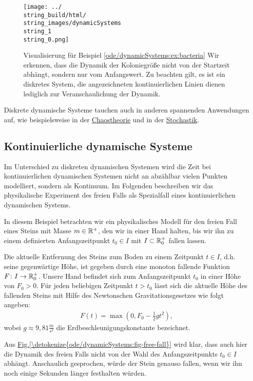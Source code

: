 \begin{figure}[htbp]
\centering


\noindent\texttt{[image: ../\\string\_build/html/\\string\_images/dynamicSystems\\string\_1\\string\_0.png]}
\caption{Visualisierung für Beispiel \cref{ode/dynamicSystems:ex:bacteria}  Wir erkennen, dass die Dynamik der Koloniegröße nicht von der Startzeit abhängt, sondern nur vom Anfangswert. Zu beachten gilt, es ist ein diskretes System, die angezeichneten kontinuierlichen Linien dienen lediglich zur Veranschaulichung der Dynamik.}\label{\detokenize{ode/dynamicSystems:fig-bacteria}}\end{figure}

Diskrete dynamische Systeme tauchen auch in anderen spannenden Anwendungen auf, wie beispielsweise in der \href{https://de.wikipedia.org/wiki/Bifurkation\_(Mathematik)\#Bifurkationsdiagramm}{Chaostheorie} und in der \href{https://de.wikipedia.org/wiki/Markow-Kette}{Stochastik}.


\subsection{Kontinuierliche dynamische Systeme}
\label{\detokenize{ode/dynamicSystems:kontinuierliche-dynamische-systeme}}
Im Unterschied zu diskreten dynamischen Systemen wird die Zeit bei kontinuierlichen dynamischen Systemen nicht an abzählbar vielen Punkten modelliert, sondern als Kontinuum.
Im Folgenden beschreiben wir das physikalische Experiment des freien Falls als Spezialfall eines kontinuierlichen dynamischen Systems.
\label{ode/dynamicSystems:ex:freefall}
\begin{example}{}{}



In diesem Beispiel betrachten wir ein physikalisches Modell für den freien Fall eines Steins mit Masse \(m \in \mathbb{R}^+\), den wir in einer Hand halten, bis wir ihn zu einem definierten Anfangszeitpunkt \(t_0 \in I\) mit \(I \subset \mathbb{R}^+_0\) fallen lassen.

Die aktuelle Entfernung des Steins zum Boden zu einem Zeitpunkt \(t \in I\), d.h. seine gegenwärtige Höhe, ist gegeben durch eine monoton fallende Funktion \(F \colon I \rightarrow \mathbb{R}^+_0\).
Unsere Hand befindet sich zum Anfangszeitpunkt \(t_0\) in einer Höhe von \(F_0 > 0\).
Für jeden beliebigen Zeitpunkt \(t > t_0\) lässt sich die aktuelle Höhe des fallenden Steins mit Hilfe des Newtonschen Gravitationsgesetzes wie folgt angeben:
\begin{align*}
F(t) = \max(0, F_0 - \frac{1}{2}gt^2),
\end{align*}
wobei \(g \approx 9,81 \frac{m}{s^2}\) die Erdbeschleunigungskonstante bezeichnet.

Aus \hyperref[\detokenize{ode/dynamicSystems:fig-free-fall}]{Fig.\@ \ref{\detokenize{ode/dynamicSystems:fig-free-fall}}} wird klar, dass auch hier die Dynamik des freien Falls nicht von der Wahl des Anfangszeitpunkts \(t_0 \in I\) abhängt.
Anschaulich gesprochen, würde der Stein genauso fallen, wenn wir ihn noch einige Sekunden länger festhalten würden.
\end{example}

